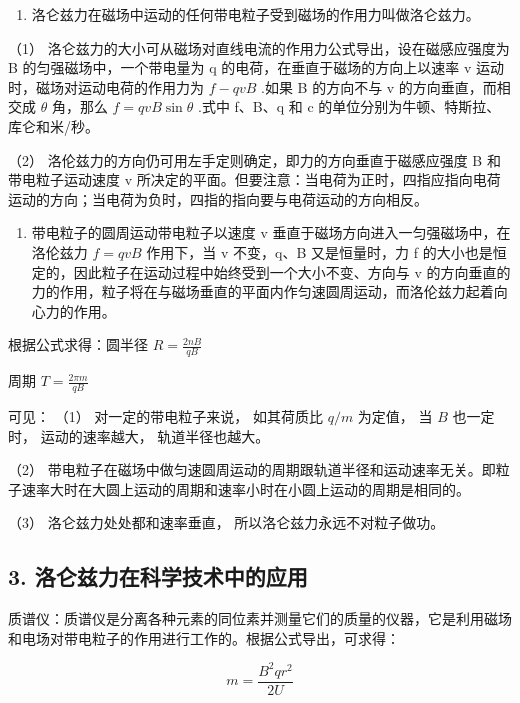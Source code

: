 \begin{enumerate}
\def\labelenumi{\arabic{enumi}.}
\tightlist
\item
  洛仑兹力在磁场中运动的任何带电粒子受到磁场的作用力叫做洛仑兹力。
\end{enumerate}

（1） 洛仑兹力的大小可从磁场对直线电流的作用力公式导出，设在磁感应强度为
B 的匀强磁场中，一个带电量为 q 的电荷，在垂直于磁场的方向上以速率 v
运动时，磁场对运动电荷的作用力为 \(f - qvB\) .如果 B 的方向不与 v
的方向垂直，而相交成 \(\theta\) 角，那么 \(f = qvB \sin \theta\) .式中
f、B、q 和 c 的单位分别为牛顿、特斯拉、库仑和米/秒。

（2） 洛伦兹力的方向仍可用左手定则确定，即力的方向垂直于磁感应强度 B
和带电粒子运动速度 v
所决定的平面。但要注意：当电荷为正时，四指应指向电荷运动的方向；当电荷为负时，四指的指向要与电荷运动的方向相反。

\begin{enumerate}
\def\labelenumi{\arabic{enumi}.}
\setcounter{enumi}{1}
\tightlist
\item
  带电粒子的圆周运动带电粒子以速度 v
  垂直于磁场方向进入一匀强磁场中，在洛伦兹力 \(f = qvB\) 作用下，当 v
  不变，q、B 又是恒量时，力 f
  的大小也是恒定的，因此粒子在运动过程中始终受到一个大小不变、方向与 v
  的方向垂直的力的作用，粒子将在与磁场垂直的平面内作匀速圆周运动，而洛伦兹力起着向心力的作用。
\end{enumerate}

根据公式求得：圆半径 \(R=\frac{2nB}{qB}\)

周期 \(T=\frac{2\pi m}{qB}\)

可见： （1） 对一定的带电粒子来说， 如其荷质比 \(q / m\) 为定值， 当
\(B\) 也一定时， 运动的速率越大， 轨道半径也越大。

（2）
带电粒子在磁场中做匀速圆周运动的周期跟轨道半径和运动速率无关。即粒子速率大时在大圆上运动的周期和速率小时在小圆上运动的周期是相同的。

（3） 洛仑兹力处处都和速率垂直， 所以洛仑兹力永远不对粒子做功。

\subsection{3.
洛仑兹力在科学技术中的应用}\label{ux6d1bux4ed1ux5179ux529bux5728ux79d1ux5b66ux6280ux672fux4e2dux7684ux5e94ux7528}

质谱仪：质谱仪是分离各种元素的同位素并测量它们的质量的仪器，它是利用磁场和电场对带电粒子的作用进行工作的。根据公式导出，可求得：

\[
m = \frac{B^{2} q r^{2}}{2 U}
\]

